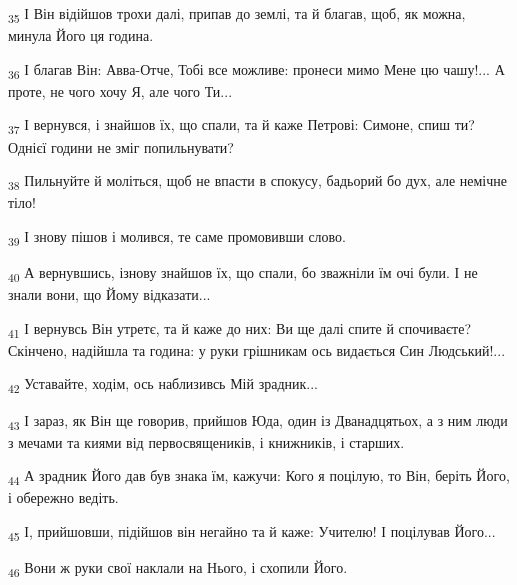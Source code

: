 \begin{tcolorbox}
\textsubscript{35} І Він відійшов трохи далі, припав до землі, та й благав, щоб, як можна, минула Його ця година.
\end{tcolorbox}
\begin{tcolorbox}
\textsubscript{36} І благав Він: Авва-Отче, Тобі все можливе: пронеси мимо Мене цю чашу!... А проте, не чого хочу Я, але чого Ти...
\end{tcolorbox}
\begin{tcolorbox}
\textsubscript{37} І вернувся, і знайшов їх, що спали, та й каже Петрові: Симоне, спиш ти? Однієї години не зміг попильнувати?
\end{tcolorbox}
\begin{tcolorbox}
\textsubscript{38} Пильнуйте й моліться, щоб не впасти в спокусу, бадьорий бо дух, але немічне тіло!
\end{tcolorbox}
\begin{tcolorbox}
\textsubscript{39} І знову пішов і молився, те саме промовивши слово.
\end{tcolorbox}
\begin{tcolorbox}
\textsubscript{40} А вернувшись, ізнову знайшов їх, що спали, бо зважніли їм очі були. І не знали вони, що Йому відказати...
\end{tcolorbox}
\begin{tcolorbox}
\textsubscript{41} І вернувсь Він утретє, та й каже до них: Ви ще далі спите й спочиваєте? Скінчено, надійшла та година: у руки грішникам ось видається Син Людський!...
\end{tcolorbox}
\begin{tcolorbox}
\textsubscript{42} Уставайте, ходім, ось наблизивсь Мій зрадник...
\end{tcolorbox}
\begin{tcolorbox}
\textsubscript{43} І зараз, як Він ще говорив, прийшов Юда, один із Дванадцятьох, а з ним люди з мечами та киями від первосвящеників, і книжників, і старших.
\end{tcolorbox}
\begin{tcolorbox}
\textsubscript{44} А зрадник Його дав був знака їм, кажучи: Кого я поцілую, то Він, беріть Його, і обережно ведіть.
\end{tcolorbox}
\begin{tcolorbox}
\textsubscript{45} І, прийшовши, підійшов він негайно та й каже: Учителю! І поцілував Його...
\end{tcolorbox}
\begin{tcolorbox}
\textsubscript{46} Вони ж руки свої наклали на Нього, і схопили Його.
\end{tcolorbox}

